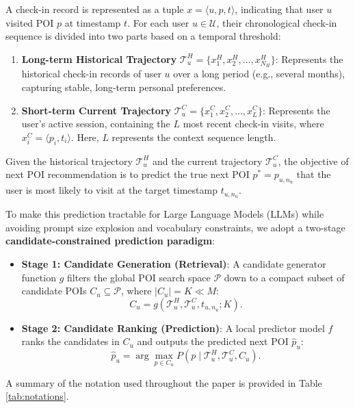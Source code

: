 \documentclass[10pt,twocolumn]{article}
\begin{document}
A check-in record is represented as a tuple $x = \langle u, p, t \rangle$, indicating that user $u$ visited POI $p$ at timestamp $t$. For each user $u \in \mathcal{U}$, their chronological check-in sequence is divided into two parts based on a temporal threshold:
\begin{enumerate}
    \item \textbf{Long-term Historical Trajectory} $\mathcal{T}^H_u = \{x^H_1, x^H_2, \dots, x^H_{N_H}\}$: Represents the historical check-in records of user $u$ over a long period (e.g., several months), capturing stable, long-term personal preferences.
    \item \textbf{Short-term Current Trajectory} $\mathcal{T}^C_u = \{x^C_1, x^C_2, \dots, x^C_L\}$: Represents the user's active session, containing the $L$ most recent check-in visits, where $x^C_i = \langle p_i, t_i \rangle$. Here, $L$ represents the context sequence length.
\end{enumerate}

Given the historical trajectory $\mathcal{T}^H_u$ and the current trajectory $\mathcal{T}^C_u$, the objective of next POI recommendation is to predict the true next POI $p^* = p_{u, n_u}$ that the user is most likely to visit at the target timestamp $t_{u, n_u}$. 

To make this prediction tractable for Large Language Models (LLMs) while avoiding prompt size explosion and vocabulary constraints, we adopt a two-stage \textbf{candidate-constrained prediction paradigm}:
\begin{itemize}
    \item \textbf{Stage 1: Candidate Generation (Retrieval)}: A candidate generator function $g$ filters the global POI search space $\mathcal{P}$ down to a compact subset of candidate POIs $C_u \subseteq \mathcal{P}$, where $|C_u| = K \ll M$:
    \begin{equation}
        C_u = g(\mathcal{T}^H_u, \mathcal{T}^C_u, t_{u, n_u}; K).
    \end{equation}
    \item \textbf{Stage 2: Candidate Ranking (Prediction)}: A local predictor model $f$ ranks the candidates in $C_u$ and outputs the predicted next POI $\hat{p}_u$:
    \begin{equation}
        \hat{p}_u = \arg\max_{p \in C_u} P(p \mid \mathcal{T}^H_u, \mathcal{T}^C_u, C_u).
    \end{equation}
\end{itemize}

A summary of the notation used throughout the paper is provided in Table \ref{tab:notations}.
\end{document}
